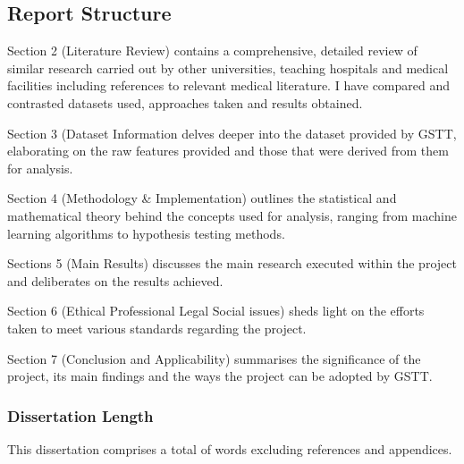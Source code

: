 \subsection{Report Structure}
\par{ \noindent Section 2 (Literature Review) contains a comprehensive, detailed review of similar research carried out by other universities, teaching hospitals and medical facilities including references to relevant medical literature. I have compared and contrasted datasets used, approaches taken and results obtained.}
\par{\noindent Section 3 (Dataset Information delves deeper into the dataset provided by GSTT, elaborating on the raw features provided and those that were derived from them for analysis.}
\par{\noindent Section 4 (Methodology \& Implementation) outlines the statistical and mathematical theory behind the concepts used for analysis, ranging from machine learning algorithms to hypothesis testing methods.}
\par{\noindent Sections 5 (Main Results) discusses the main research executed within the project and deliberates on the results achieved.}
\par{\noindent Section 6 (Ethical Professional Legal Social issues) sheds light on the efforts taken to meet various standards regarding the project.}
\par{\noindent Section 7 (Conclusion and Applicability) summarises the significance of the project, its main findings and the ways the project can be adopted by GSTT.}



\subsubsection{Dissertation Length}
This dissertation comprises a total of  words excluding references and appendices.





